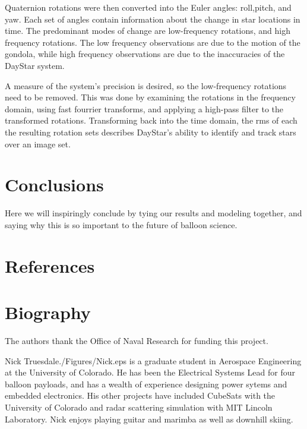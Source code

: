 \documentclass[twocolumn,letterpaper]{IEEEAerospace2012}
\newcommand{\rootdir}{./Figures/}
\begin{document}
Quaternion rotations were then converted into the Euler angles: roll,pitch, and yaw. Each set of angles contain information about the change in star locations in time. The predominant modes of change are low-frequency rotations, and high frequency rotations. The low frequency observations are due to the motion of the gondola, while high frequency observations are due to the inaccuracies of the DayStar system.

A measure of the system's precision is desired, so the low-frequency rotations need to be removed. This was done by examining the rotations in the frequency domain, using fast fourrier transforms, and applying a high-pass filter to the transformed rotations. Transforming back into the time domain, the rms of each the resulting rotation sets describes DayStar's ability to identify and track stars over an image set.



\section{Conclusions}
Here we will inspiringly conclude by tying our results and modeling together, and saying why this is so important to the future of balloon science.

\section{References}


\section{Biography}

\appendices

\acknowledgments
The authors thank the Office of Naval Research for funding this project.


\thebiography
\begin{biographywithpic}{Nick Truesdale}{\rootdir Nick.eps}
is a graduate student in Aerospace Engineering at the University of Colorado.
He has been the Electrical Systems Lead for four balloon payloads, and has a wealth of experience designing power sytems and embedded electronics. His other projects have included CubeSats with the University of Colorado and radar scattering simulation with MIT Lincoln Laboratory. Nick enjoys playing guitar and marimba as well as downhill skiing.
\end{biographywithpic}
\end{document}

